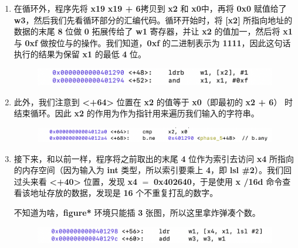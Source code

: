 \begin{enumerate}
\begin{figure}[htbp]
                \end{figure}
            \newpage
            \item 在循环外，程序先将 \textbf{x19} \textbf{x19 + 6}拷贝到 \textbf{x2} 和 \textbf{x0}中，再将 \textbf{0x0} 赋值给了 \textbf{w3}，然后我们先看循环部分的汇编代码。循环开始时，将 \textbf{[x2]} 所指向地址的数据的末尾 \textbf{8} 位做 \textbf{0} 拓展传给了 \textbf{w1} 寄存器，并让 \textbf{x2} 的值加一，然后将 \textbf{x1} 与 \textbf{0xf} 做按位与的操作。我们知道，\textbf{0xf} 的二进制表示为 \textbf{1111}，因此这句话执行的结果为保留 \textbf{x1} 的最低 \textbf{4} 位。
                \begin{figure}[htbp]
                    \hspace*{1.5cm}
                    \includegraphics*[width = 12cm]{s5_3.png}
                \end{figure}
            \item 此外，我们注意到 \textbf{<+64>} 位置在 \textbf{x2} 的值等于 \textbf{x0}（即最初的 \textbf{x2 + 6}） 时结束循环。因此 \textbf{x2} 的作用为作为指针用来遍历我们输入的字符串。
                \begin{figure}[htbp]
                    \hspace*{1.5cm}
                    \includegraphics*[width = 12cm]{s5_4.png}
                \end{figure}
            \item 接下来，和以前一样，程序将之前取出的末尾 \textbf{4} 位作为索引去访问 \textbf{x4} 所指向的内存空间（因为输入为 \textbf{int} 类型，所以索引要乘上 \textbf{4}，即 \textbf{lsl \#2}）。我们回过头来看 \textbf{<+40>} 位置，发现 \textbf{x4} $=$ \textbf{0x402640}，于是使用 \textbf{x /16d} 命令查看该地址存放的数据，发现是 \textbf{16} 个不重复打乱的数字。 
                \par 不知道为啥，\textbf{figure*} 环境只能插 \textbf{3} 张图，所以这里拿炸弹凑个数。
                \begin{figure}[htbp]
                    \hspace*{1.5cm}
                    \includegraphics*[width = 12cm]{s5_5_0.png} \\

\end{figure}
\end{enumerate}
